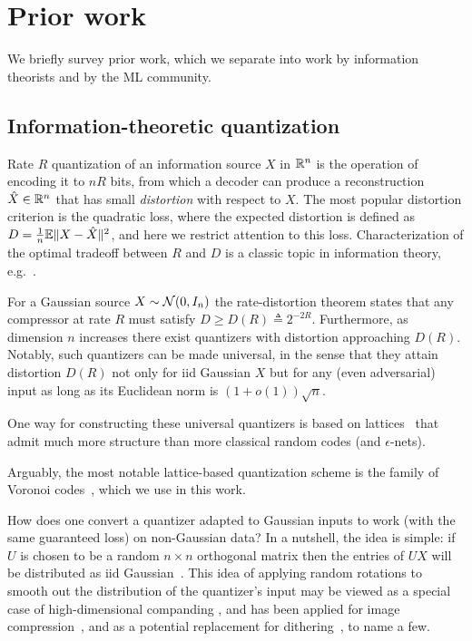 \section{Prior work}\label{sec:prior}

We briefly survey prior work, which we separate into work by information theorists and by the ML community.

\subsection{Information-theoretic quantization}

Rate $R$ quantization of an information source $X$ in $\mathbb{R}^n$ is the operation of encoding it to $nR$ bits, from which a decoder can produce a reconstruction $\hat{X}\in\mathbb{R}^n$ that has small \emph{distortion} with respect to $X$. The most popular distortion criterion is the quadratic loss, where the expected distortion is defined as $D=\frac{1}{n}\mathbb{E}\|X-\hat{X}\|^2$, and here we restrict attention to this loss. Characterization of the optimal tradeoff between $R$ and $D$ is a classic topic in information theory, e.g.~\cite[Part V]{PWbook24}.

For a Gaussian source $X\sim\mathcal{N}(0,I_n)$ the rate-distortion theorem states that any compressor at rate $R$ must satisfy 
$D\geq D(R)\triangleq 2^{-2R}$. Furthermore, as dimension $n$ increases there exist quantizers with distortion approaching $D(R)$. Notably, such quantizers can be made universal, in the sense that they attain distortion $D(R)$ not only for iid Gaussian $X$ but for any  (even adversarial) input as long as its Euclidean norm is $(1+o(1))\sqrt{n}$.
%

One way for constructing these universal quantizers is based on lattices~\cite{ramiBook} that admit much more structure than more classical random codes (and $\epsilon$-nets).

Arguably, the most notable lattice-based quantization scheme is the family of Voronoi codes~\cite{ConwaySloane83}, which we use in this work.

How does one convert a quantizer adapted to Gaussian inputs to work (with the same guaranteed loss) on non-Gaussian data? In a nutshell, the idea is simple: if $U$ is chosen to be a  random $n\times n$ orthogonal matrix then the entries of $UX$ will be distributed as iid Gaussian~\cite{stam1982limit}. 
This idea of applying random rotations to smooth out the distribution of the quantizer's input may be viewed as a special case of high-dimensional companding \cite{gersho1979asymptotically}, and has been applied for image compression~\cite{hung1998multidimensional}, and as a potential replacement for dithering~\cite{hadad2016dithered}, to name a few. 



